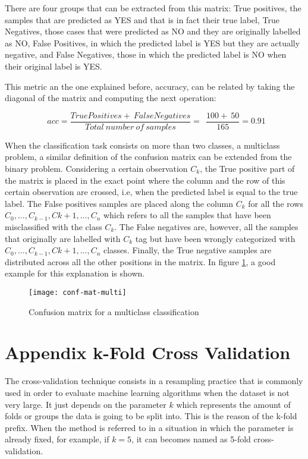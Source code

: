 	There are four groups that can be extracted from this matrix: True positives, the samples that are predicted as YES and that is in fact their true label, True Negatives, those cases that were predicted as NO and they are originally labelled as NO, False Positives, in which the predicted label is YES but they are actually negative, and False Negatives, those in which the predicted label is NO when their original label is YES.
	
	This metric an the one explained before, accuracy, can be related by taking the diagonal of the matrix and computing the next operation:
	
	\[
	\ \ acc = \frac{TruePositives +\ FalseNegatives}{Total\ number\ of\ samples} = 
	\ \ \frac{100 +\ 50}{165} = 0.91
	\]
	
	When the classification task consists on more than two classes, a multiclass problem, a similar definition of the confusion matrix can be extended from the binary problem. Considering a certain observation $C_k$, the True positive part of the matrix is placed in the exact point where the column and the row of this certain observation are crossed, i.e, when the predicted label is equal to the true label. The False positives samples are placed along the column $C_k$ for all the rows $C_0, ..., C_{k-1}, C{k+1}, ..., C_n$ which refers to all the samples that have been misclassified with the class $C_k$. The False negatives are, however, all the samples that originally are labelled with $C_k$ tag but have been wrongly categorized with $C_0, ..., C_{k-1}, C{k+1}, ..., C_n$ classes. Finally, the True negative samples are distributed across all the other positions in the matrix. In figure \ref{fig:mesh9}, a good example for this explanation is shown.
	
	\begin{figure}[h]
		\centering
		\captionsetup{justification=centering}
		\texttt{[image: conf-mat-multi]}
		\caption{Confusion matrix for a multiclass classification \cite{Kruger2018}}
		\label{fig:mesh9}
	\end{figure}
	
\chapter{Appendix k-Fold Cross Validation}
\label{appendix:kfold}

	The cross-validation technique consists in a resampling practice that is commonly used in order to evaluate machine learning algorithms when the dataset is not very large. It just depends on the parameter $k$ which represents the amount of folds or groups the data is going to be split into. This is the reason of the k-fold prefix. When the method is referred to in a situation in which the parameter is already fixed, for example, if $k = 5$, it can becomes named as 5-fold cross-validation.
	
